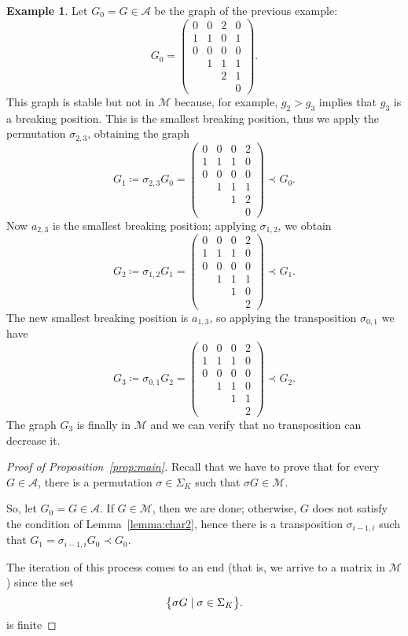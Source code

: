 \documentclass{amsart}
\theoremstyle{plain}
\theoremstyle{definition}
\newtheorem{example}[theorem]{Example}
\newcommand{\psm}[1]{\left(\begin{smallmatrix}#1\end{smallmatrix}\right)}
\begin{document}
\begin{example}
  Let $G_0 = G \in \mathcal{A}$ be the graph of the previous
  example:
  \[
  G_0 = \psm{ 0 & 0 & 2 & 0\\ 1 & 1 & 0 & 1\\ 0 & 0 & 0 & 0\\ & 1 & 1
    & 1\\ && 2 & 1\\ &&& 0 }\text{.}
  \]
  This graph is stable but not in $\mathcal{M}$ because, for example,
  $g_2 > g_3$ implies that $g_3$ is a breaking position. This is
  the smallest breaking position, thus we apply the permutation $\sigma_{2,3}$, obtaining
  the graph
  \[
  G_1 \coloneqq \sigma_{2,3} G_0 = \psm{ 0 & 0 & 0 & 2\\
    1 & 1 & 1 & 0\\ 0 & 0 & 0 & 0\\ & 1 & 1 & 1\\ && 1 & 2\\ &&& 0 }
  \prec G_0\text{.}
  \]
  Now $a_{2,3}$ is the smallest breaking position; applying
  $\sigma_{1,2}$, we obtain
  \[
  G_2 \coloneqq \sigma_{1,2} G_1 = \psm{ 0 & 0 & 0 & 2\\ 1 & 1 & 1 &
    0\\ 0 & 0 & 0 & 0\\ & 1 & 1 & 1\\ && 1 & 0\\ &&& 2 } \prec
  G_1\text{.}
  \]
  The new smallest breaking position is $a_{1,3}$, so applying the
  transposition $\sigma_{0,1}$ we have 
  \[
  G_3 \coloneqq \sigma_{0,1} G_2 = \psm{ 0 & 0 & 0 & 2\\ 1 & 1 & 1 &
    0\\ 0 & 0 & 0 & 0\\ & 1 & 1 & 0\\ && 1 & 1\\ &&& 2 } \prec
  G_2\text{.}
  \]
  The graph $G_3$ is finally in $\mathcal{M}$ and we can verify that no
  transposition can decrease it.
\end{example}

\begin{proof}[Proof of Proposition~\ref{prop:main}]
  Recall that we have to prove that for every $G \in \mathcal{A}$,
  there is a permutation $\sigma \in \Sigma_K$ such that $\sigma G \in
  \mathcal{M}$.

  So, let $G_0 = G \in \mathcal{A}$. If $G \in \mathcal{M}$, then we
  are done; otherwise, $G$ does not satisfy the condition of
  Lemma~\ref{lemma:char2}, hence there is a transposition
  $\sigma_{i-1, i}$ such that $G_1 = \sigma_{i-1,i} G_0 \prec G_0$.

  The iteration of this process comes to an end (that is, we arrive to
  a matrix in $\mathcal{M}$) since the set
  \[
  \bigl\{ \sigma G \mid \sigma \in \Sigma_K\bigr\}\text{.}\qedhere
  \]
  is finite
\end{proof}
\end{document}
